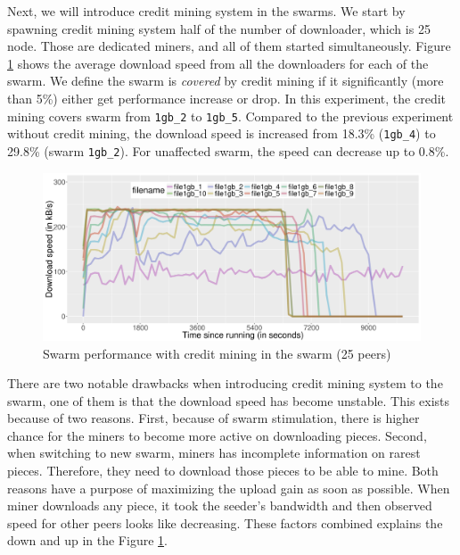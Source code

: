 Next, we will introduce credit mining system in the swarms. We start by spawning credit mining system half of the number of downloader, which is 25 node. Those are dedicated miners, and all of them started simultaneously. Figure \ref{fig:swarmcm25perf} shows the average download speed from all the downloaders for each of the swarm. We define the swarm is \textit{covered} by credit mining if it significantly (more than 5\%) either get performance increase or drop. In this experiment, the credit mining covers swarm from \texttt{1gb\_2} to \texttt{1gb\_5}. Compared to the previous experiment without credit mining, the download speed is increased from 18.3\% (\texttt{1gb\_4}) to 29.8\% (swarm \texttt{1gb\_2}). For unaffected swarm, the speed can decrease up to 0.8\%.

\begin{figure}[h!]
	\centering
	\includegraphics[width=\textwidth]{pics/results/swperf_sc2_25.png}
	\caption{Swarm performance with credit mining in the swarm (25 peers)}
	\label{fig:swarmcm25perf}
\end{figure}

There are two notable drawbacks when introducing credit mining system to the swarm, one of them is that the download speed has become unstable. This exists because of two reasons. First, because of swarm stimulation, there is higher chance for the miners to become more active on downloading pieces. Second, when switching to new swarm, miners has incomplete information on rarest pieces. Therefore, they need to download those pieces to be able to mine. Both reasons have a purpose of maximizing the upload gain as soon as possible. When miner downloads any piece, it took the seeder's bandwidth and then observed speed for other peers looks like decreasing. These factors combined explains the down and up in the Figure \ref{fig:swarmcm25perf}.


